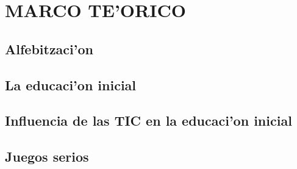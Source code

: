 
\chapter{MARCO TE'ORICO}



\section{Alfebitzaci'on}







\section{La educaci'on inicial}


\section{Influencia de las TIC en la educaci'on inicial}


\section{Juegos serios}




